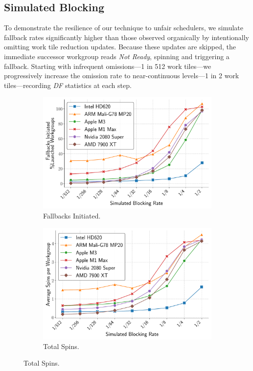 \documentclass[sigconf]{acmart}
\begin{document}
\subsection{Simulated Blocking}\label{sec:Sim-Blocking}
To demonstrate the resilience of our technique to unfair schedulers, we simulate fallback rates significantly higher than those observed organically by intentionally omitting work tile reduction updates. Because these updates are skipped, the immediate successor workgroup reads \emph{Not Ready}, spinning and triggering a fallback. Starting with infrequent omissions---1 in 512 work tiles---we progressively increase the omission rate to near-continuous levels---1 in 2 work tiles---recording \emph{DF} statistics at each step.
\begin{figure}
  \centering
  \begin{subfigure}[t]{0.48\linewidth}
    \centering
    \includegraphics[width=\linewidth]{graphics/fallbacksInitiated_plot.pdf}
    \caption{Fallbacks Initiated.\label{fig:fallbacks_initiated}}
  \end{subfigure}\hfill
  \begin{subfigure}[t]{0.48\linewidth}
    \centering
    \includegraphics[width=\linewidth]{graphics/totalSpins_plot.pdf}
    \caption{Total Spins.\label{fig:total_spins}}
  \end{subfigure}


\end{figure}
\end{document}
